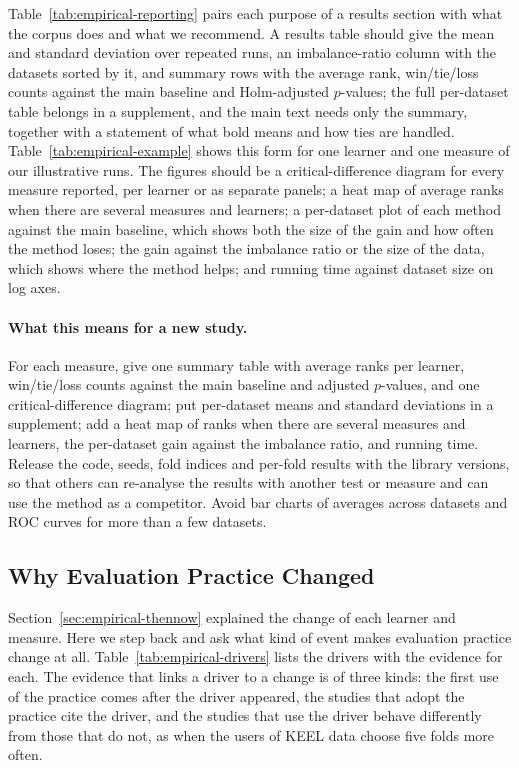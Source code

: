 Table~\ref{tab:empirical-reporting} pairs each purpose of a results section with what the corpus does and what we recommend. A results table should give the mean and standard deviation over repeated runs, an imbalance-ratio column with the datasets sorted by it, and summary rows with the average rank, win/tie/loss counts against the main baseline and Holm-adjusted $p$-values; the full per-dataset table belongs in a supplement, and the main text needs only the summary, together with a statement of what bold means and how ties are handled. Table~\ref{tab:empirical-example} shows this form for one learner and one measure of our illustrative runs. The figures should be a critical-difference diagram for every measure reported, per learner or as separate panels; a heat map of average ranks when there are several measures and learners; a per-dataset plot of each method against the main baseline, which shows both the size of the gain and how often the method loses; the gain against the imbalance ratio or the size of the data, which shows where the method helps; and running time against dataset size on log axes.





\paragraph{What this means for a new study.} For each measure, give one summary table with average ranks per learner, win/tie/loss counts against the main baseline and adjusted $p$-values, and one critical-difference diagram; put per-dataset means and standard deviations in a supplement; add a heat map of ranks when there are several measures and learners, the per-dataset gain against the imbalance ratio, and running time. Release the code, seeds, fold indices and per-fold results with the library versions, so that others can re-analyse the results with another test or measure and can use the method as a competitor. Avoid bar charts of averages across datasets and ROC curves for more than a few datasets.

\subsection{Why Evaluation Practice Changed}
\label{sec:empirical-why}

Section~\ref{sec:empirical-thennow} explained the change of each learner and measure. Here we step back and ask what kind of event makes evaluation practice change at all. Table~\ref{tab:empirical-drivers} lists the drivers with the evidence for each. The evidence that links a driver to a change is of three kinds: the first use of the practice comes after the driver appeared, the studies that adopt the practice cite the driver, and the studies that use the driver behave differently from those that do not, as when the users of KEEL data choose five folds more often.

